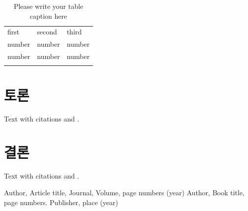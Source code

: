 %
\begin{table}
\caption{Please write your table caption here}
\label{tab:1}       %
\begin{tabular}{lll}
\hline\noalign{\smallskip}
first & second & third  \\
\noalign{\smallskip}\hline\noalign{\smallskip}
number & number & number \\
number & number & number \\
\noalign{\smallskip}\hline
\end{tabular}
\end{table}

\section{토론}
\label{sec:2}
Text with citations \cite{RefB} and \cite{RefJ}.

\section{결론}
\label{sec:3}
Text with citations \cite{RefB} and \cite{RefJ}.



%
%



\begin{thebibliography}{asdf}
%
%
Author, Article title, Journal, Volume, page numbers (year)
Author, Book title, page numbers. Publisher, place (year)
\end{thebibliography}




